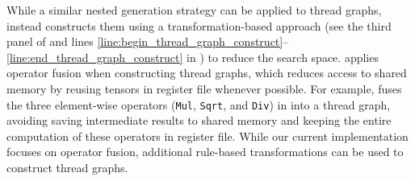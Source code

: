 While a similar nested generation strategy can be applied to thread graphs, \sys instead constructs them using a transformation-based approach (see the third panel of  and lines \ref{line:begin_thread_graph_construct}–\ref{line:end_thread_graph_construct} in ) to reduce the search space. 
%
\sys applies operator fusion when constructing thread graphs, which reduces access to shared memory by reusing tensors in register file whenever possible. 
For example, \sys fuses the three element-wise operators ({\tt Mul}, {\tt Sqrt}, and {\tt Div}) in  into a thread graph, avoiding saving intermediate results to shared memory and keeping the entire computation of these operators in register file.
While our current implementation focuses on operator fusion, additional rule-based transformations can be used to construct thread graphs.


